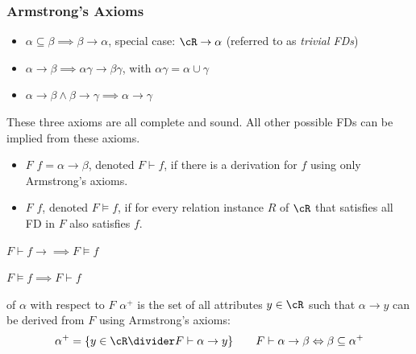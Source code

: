 \subsubsection{Armstrong's Axioms}
\begin{itemize}
    \item {} $\alpha \subseteq \beta \implies \beta \rightarrow \alpha$, special case: $\cR \rightarrow \alpha$ (referred to as \textit{trivial FDs})
    \item {} $\alpha \rightarrow \beta \implies \alpha \gamma \rightarrow \beta \gamma$, with $\alpha \gamma = \alpha \cup \gamma$
    \item {} $\alpha \rightarrow \beta \land \beta \rightarrow \gamma \implies \alpha \rightarrow \gamma$
\end{itemize}
These three axioms are all complete and sound.
All other possible FDs can be implied from these axioms.


\begin{itemize}
    \item $F$  $f = \alpha \rightarrow \beta$, denoted $F \vdash f$, if there is a derivation for $f$ using only Armstrong's axioms.
    \item $F$  $f$, denoted $F \models f$, if for every relation instance $R$ of $\cR$ that satisfies all FD in $F$ also satisfies $f$.
\end{itemize}

\inlinedefinition[Soundness] $F \vdash f \rightarrow \implies F \models f$

\inlinedefinition[Completeness] $F \models f \implies F \vdash f$

\inlinedefinition[Closure] of $\alpha$ with respect to $F$ $\alpha^+$ is the set of all attributes $y \in \cR$ such that $\alpha \rightarrow y$ can be derived from $F$
using Armstrong's axioms:
\[
    \alpha^+ = \{ y \in \cR \divider F \vdash \alpha \rightarrow y \} \qquad F \vdash \alpha \rightarrow \beta \Leftrightarrow \beta \subseteq \alpha^+
\]

